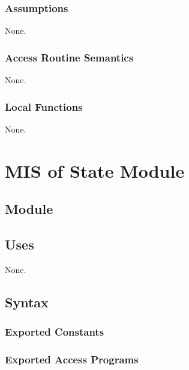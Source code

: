 \documentclass[12pt, titlepage]{article}
\begin{document}
\subsubsection{Assumptions}

None.

\subsubsection{Access Routine Semantics}

None.

\subsubsection{Local Functions}

None.

\newpage

\section{MIS of State Module} \label{Module_state} 



\subsection{Module}


\subsection{Uses}
None.

\subsection{Syntax}

\subsubsection{Exported Constants}

\subsubsection{Exported Access Programs}
\end{document}
